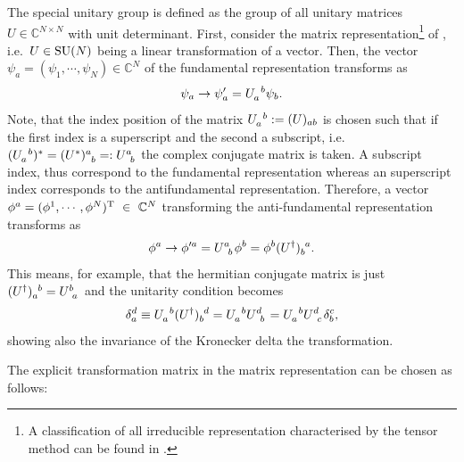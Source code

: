 The special unitary group is defined as the group of all unitary matrices $ U \in \mathbb{C}^{N \times N}$ with unit determinant.
First, consider the matrix representation\footnote{A classification of all irreducible representation characterised by the tensor method can be found in .} of , i.e.\ $ U \in \mathrm{SU}( N ) $ being a linear transformation of a vector. Then, the vector $ \psi_{a} = (\psi_{1}, \cdots, \psi_{N}) \in \mathbb{C}^{N} $ of the fundamental representation transforms as
\begin{equation}
	\begin{aligned}
		\psi_{a} \rightarrow \psi^{\prime}_{a} = \tensor{U}{_{a}^{b}} \psi_{b}
		\text{.}
	\end{aligned}
\end{equation}
Note, that the index position of the matrix $ \tensor{U}{_{a}^{b}} := (U)_{ab} $ is \cite[s.][Chap. 8.5 and App. B \& C]{Costa.2012} chosen such that if the first index is a superscript and the second a subscript, i.e.\
$ (\tensor{U}{_{a}^{b}})^{*} = \tensor{(U^{*})}{^{a}_{b}} =: \tensor{U}{^{a}_{b}} $ the complex conjugate matrix is taken. A subscript index, thus correspond to the fundamental representation whereas an superscript index corresponds to the antifundamental representation.
Therefore, a vector $ \phi^{a} = (\phi^{1}, \cdots, \phi^{N})^{\mathrm{T}}~\in~\mathbb{C}^{N} $ transforming \wrt the anti-fundamental representation transforms as
\begin{equation}
	\begin{aligned}
		\phi^{a} \rightarrow \phi^{\prime a}
		= \tensor{U}{^{a}_{b}} \phi^{b}
		= \phi^{b} \tensor{(U^{\dagger})}{_{b}^{a}}
		\text{.}
	\end{aligned}
\end{equation}
This means, for example, that the hermitian conjugate matrix is just $ \tensor{(U^{\dagger})}{_{a}^{b}} = \tensor{U}{^{b}_{a}} $ and the unitarity condition becomes
\begin{equation}
	\begin{aligned}
		\tensor*{\delta}{_{a}^{d}}
		\equiv \tensor{U}{_{a}^{b}} \tensor{(U^{\dagger})}{_{b}^{d}}
		= \tensor{U}{_{a}^{b}} \tensor{U}{^{d}_{b}}
		= \tensor{U}{_{a}^{b}} \tensor{U}{^{d}_{c}} \tensor*{\delta}{_{b}^{c}}
		\text{,}
	\end{aligned}
\end{equation}
showing also the invariance of the Kronecker delta \wrt the  transformation.\par
%
The explicit transformation matrix in the matrix representation can be chosen as follows:
